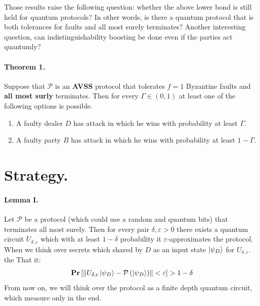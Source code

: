 \documentclass{article}
\begin{document}

Those results raise the following question:  whether the above lower bond is still held for quantum protocols?  In other words, is there a quantum protocol that is both tolerances for faults and all most surely terminates? Another interesting question, can indistinguishability boosting be done even if the parties act quantumly? 


\paragraph{Theorem 1.} Suppose that \( \mathcal{P} \) is an \textbf{AVSS} protocol that tolerates \(f = 1\) Byzantine faults and \textbf{all most surly} terminates. Then for every \( \Gamma \in \left(0, 1\right)\) at least one of the following options is possible.
\begin{enumerate}
    \item A faulty dealer \(D\) has attack in which he wins with probability at least \( \Gamma \).
    \item A faulty party \(B\) has attack in which he wins with probability at least \( 1 - \Gamma \).
\end{enumerate}

\section{Strategy.}

\paragraph{Lemma I.} Let \(\mathcal{P}\) be a protocol (which could use a random and quantum bits) that terminates all most surely. Then for every pair \( \delta,\varepsilon >0 \) there exists a quantum circuit \(U_{\delta,\varepsilon}\) which with at least \(1 - \delta\) probability it \(\varepsilon\)-approximates the protocol. When we think over secrets which shared by \(D\) as an input state \( \ket{\psi_{D}} \) for \(U_{\delta,\varepsilon}\). the That it:  
\begin{equation}
    \mathbf{Pr} \left[ {\left\lVert U_{\delta,\varepsilon}\ket{\psi_{D}} - \mathcal{P}\left(\ket{\psi_{D}}\right)\right\rVert < \varepsilon} \right] > 1 - \delta      
\end{equation} From now on, we will think over the protocol as a finite depth quantum circuit, which measure only in the end. 
\end{document}
